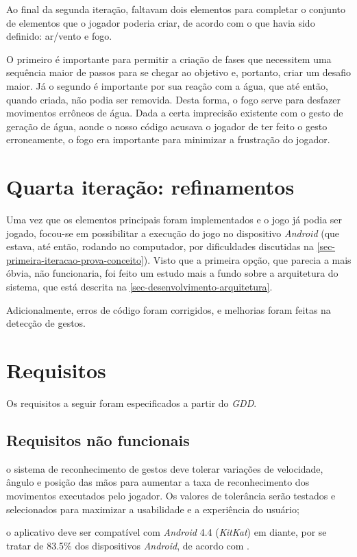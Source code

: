Ao final da segunda iteração, faltavam dois elementos para
completar o conjunto de elementos que o jogador poderia criar, de acordo
com o que havia sido definido: ar/vento e fogo.

O primeiro é importante para permitir a criação de fases que necessitem uma 
sequência maior de passos para se chegar ao objetivo e, portanto, criar
um desafio maior. Já o segundo é importante por sua reação com a água, 
que até então, quando criada, não podia ser removida. Desta forma, o 
fogo serve para desfazer movimentos errôneos de água. Dada a certa 
imprecisão existente com o gesto de geração de água, aonde o nosso
código acusava o jogador de ter feito o gesto erroneamente, o fogo era
importante para minimizar a frustração do jogador.

\section{Quarta iteração: refinamentos}\label{sec-quarta-iteracao-integracao}

Uma vez que os elementos principais foram implementados e o jogo já podia
ser jogado, focou-se em possibilitar a execução do jogo no dispositivo \textit{Android}
(que estava, até então, rodando no computador, por dificuldades 
discutidas na \autoref{sec-primeira-iteracao-prova-conceito}). Visto que
a primeira opção, que parecia a mais óbvia, não funcionaria, foi feito um 
estudo mais a fundo sobre a arquitetura do sistema, que está descrita
na \autoref{sec-desenvolvimento-arquitetura}. 

Adicionalmente, erros de código foram corrigidos, e melhorias foram
feitas na detecção de gestos.

\section{Requisitos}\label{sec-requisitos}

Os requisitos a seguir foram especificados a partir do \textit{GDD}.

\subsection{Requisitos não funcionais}\label{subsec-requisitos-nao-funcionais}

\begin{alineas}
	\item o sistema de reconhecimento de gestos deve tolerar variações 
	 de velocidade, ângulo e posição das mãos para aumentar a taxa 
 	 de reconhecimento dos movimentos executados pelo jogador. Os 
	 valores de tolerância serão testados e selecionados para maximizar 
	 a usabilidade e a experiência do usuário;
	\item o aplicativo deve ser compatível com \textit{Android} 4.4
	 (\textit{KitKat}) em diante, por se tratar de 83.5\% dos 
	 dispositivos \textit{Android}, de acordo com 
	 \cite{google:2016:androidVersion}.
	
\end{alineas}


